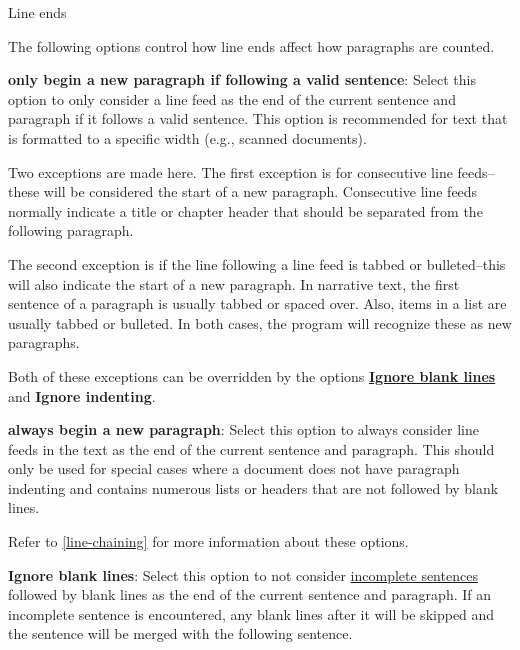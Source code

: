 \documentclass[
]{book}
\newenvironment{optionssection}
    {
    \begin{tcolorbox}[colframe=lightgray,colback=ultralightgray,sharp corners=all,parbox=false]
    }
    {
    \end{tcolorbox}
    }
\newenvironment{optionssectiontitle}
    {
    \begin{tcolorbox}[colframe=lightgray,colback=lightgray]
    \bfseries
    }
    {
    \end{tcolorbox}
    }
\theoremstyle{definition}
\theoremstyle{definition}
\theoremstyle{definition}
\theoremstyle{definition}
\theoremstyle{remark}
\begin{document}
\begin{optionssection}

\begin{optionssectiontitle}
Line ends

\end{optionssectiontitle}

The following options control how line ends affect how paragraphs are counted.

\textbf{only begin a new paragraph if following a valid sentence}: Select this option to only consider a line feed as the end of the current sentence and paragraph if it follows a valid sentence. This option is recommended for text that is formatted to a specific width (e.g., scanned documents).

Two exceptions are made here. The first exception is for consecutive line feeds--these will be considered the start of a new paragraph. Consecutive line feeds normally indicate a title or chapter header that should be separated from the following paragraph.

The second exception is if the line following a line feed is tabbed or bulleted--this will also indicate the start of a new paragraph. In narrative text, the first sentence of a paragraph is usually tabbed or spaced over. Also, items in a list are usually tabbed or bulleted. In both cases, the program will recognize these as new paragraphs.

Both of these exceptions can be overridden by the options \protect\hyperlink{options-sentence-deduction}{\textbf{Ignore blank lines}} and \textbf{Ignore indenting}.

\textbf{always begin a new paragraph}: Select this option to always consider line feeds in the text as the end of the current sentence and paragraph. This should only be used for special cases where a document does not have paragraph indenting and contains numerous lists or headers that are not followed by blank lines.

Refer to \ref{line-chaining} for more information about these options.

\end{optionssection}

\textbf{Ignore blank lines}: Select this option to not consider \protect\hyperlink{how-text-is-excluded}{incomplete sentences} followed by blank lines as the end of the current sentence and paragraph. If an incomplete sentence is encountered, any blank lines after it will be skipped and the sentence will be merged with the following sentence.
\end{document}
